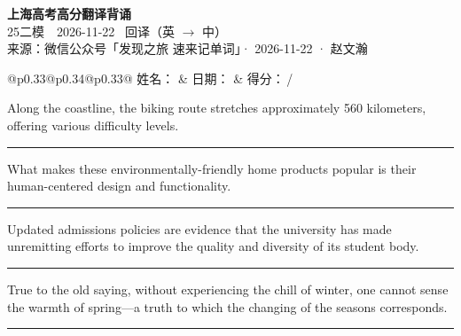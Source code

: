 \documentclass[11pt,a4paper]{article}
\newcommand{\num}[1]{\makebox[1.9em][r]{#1.}\hspace{0.3em}}
\newcommand{\wline}{\noindent\rule{\linewidth}{0.4pt}}
\begin{document}
\pagestyle{plain}
\begin{center}
{\LARGE\bfseries 上海高考高分翻译背诵 }\\[0.25em]
{\large 25二模　2026-11-22 \quad\ 回译（英 $\to$ 中）}\\[0.35em]
{\footnotesize 来源：微信公众号「发现之旅 速来记单词」· 2026-11-22 · 赵文瀚}
\end{center}

\vspace{0.4em}
\noindent\begin{tabular}{@{}p{0.33\textwidth}@{}p{0.34\textwidth}@{}p{0.33\textwidth}@{}}
姓名：\underline{\hspace{2.0cm}} & 日期：\underline{\hspace{2.0cm}} & 得分：\underline{\hspace{1.4cm}}\,/ \\
\end{tabular}

\vspace{0.5em}

\vspace{0.8em}
\num{1}Along the coastline, the biking route stretches approximately 560 kilometers, offering various difficulty levels.

\vspace{0.25em}

\wline

\num{2}What makes these environmentally-friendly home products popular is their human-centered design and functionality.

\vspace{0.25em}

\wline

\num{3}Updated admissions policies are evidence that the university has made unremitting efforts to improve the quality and diversity of its student body.

\vspace{0.25em}

\wline

\num{4}True to the old saying, without experiencing the chill of winter, one cannot sense the warmth of spring—a truth to which the changing of the seasons corresponds.

\vspace{0.25em}

\wline
\end{document}
